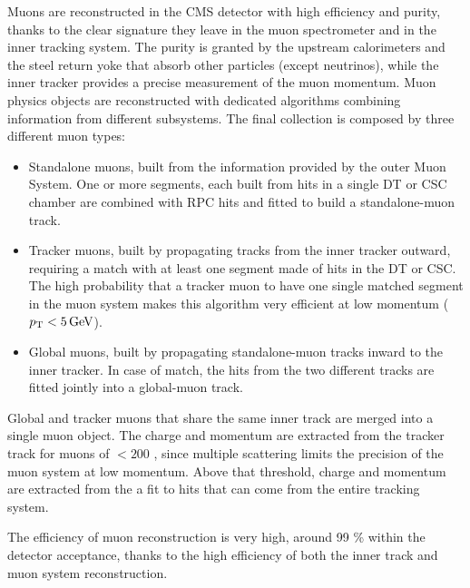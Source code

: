 Muons are reconstructed in the CMS detector with high efficiency and purity,
thanks to the clear signature they leave in the muon spectrometer and in the inner tracking system.
The purity is granted by the upstream calorimeters and the steel return yoke that absorb other particles (except neutrinos),
while the inner tracker provides a precise measurement of the muon momentum.
Muon physics objects are reconstructed with dedicated algorithms combining information from different subsystems.
The final collection is composed by three different muon types:

\begin{itemize}
\item Standalone muons, built from the information provided by the outer Muon System.
      One or more segments, each built from hits in a single DT or CSC chamber are combined
      with RPC hits and fitted to build a standalone-muon track.
\item Tracker muons, built by propagating tracks from the inner tracker outward,
      requiring a match with at least one segment made of hits in the DT or CSC.
      The high probability that a tracker muon to have one single matched segment in the muon system
      makes this algorithm very efficient at low momentum ($p_{\mathrm{T}} < 5 \,\text{Ge\hspace{-.08em}V}$).
\item Global muons, built by propagating standalone-muon tracks inward to the inner tracker.
      In case of match, the hits from the two different tracks are fitted jointly into a global-muon track.
\end{itemize}

Global and tracker muons that share the same inner track are merged into a single muon object.
The charge and momentum are extracted from the tracker track for muons of \PT $< 200$ \GeV,
since multiple scattering limits the precision of the muon system at low momentum.
Above that threshold, charge and momentum are extracted from the a fit to hits that can come from the entire tracking system.

The efficiency of muon reconstruction is very high, around 99 \% within the detector acceptance,
thanks to the high efficiency of both the inner track and muon system reconstruction.
